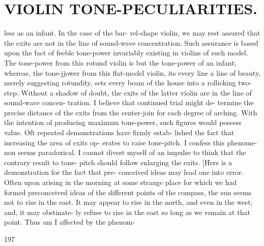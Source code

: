 \documentclass{article}
\begin{document}
\section*{VIOLIN TONE-PECULIARITIES.}
less as an infant. In the case of the bar- rel-shape violin, we may rest assured that the exits are not in the line of sound-wave concentration. Such assurance is based upon the fact of feeble tone-power invariably existing in violins of such model. The tone-power from this rotund violin is but the tone-power of an infant; whereas, the tone-jjower from this flat-model violin, its every line a line of beauty, merely suggesting rotundity, sets every beam of the house into a rollicking two- step. Without a shadow of doubt, the exits of the latter violin are in the line of sound-wave concen- tration. I believe that continued trial might de- termine the precise distance of the exits from the center-join for each degree of arching. With the intention of producing maximum tone-power, such figures would possess value. Oft repeated demonstrations have firmly estab- lished the fact that increasing the area of exits op- erates to raise tone-pitch. I confess this phenome- non seems paradoxical. I cannot divest myself of an impulse to think that the contrary result to tone- pitch should follow enlarging the exits. [Here is a demonstration for the fact that pre- conceived ideas may lead one into error. Often upon arising in the morning at some strange place for which we had formed preconceived ideas of the different points of the compass, the sun seems not to rise in the east. It may appear to rise in the north, and even in the west; and, it may obstinate- ly refuse to rise in the east so long as we remain at that point. Thus am I affected by the phenom-

197
\end{document}
